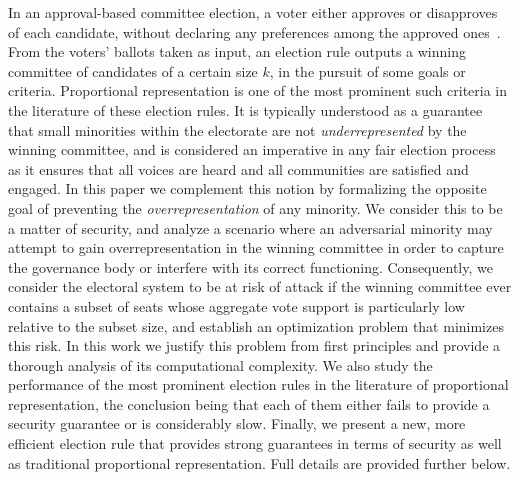 



In an approval-based committee election, a voter either approves or disapproves of each candidate, without declaring any preferences among the approved ones~\cite{lackner2020approval}. From the voters' ballots taken as input, an election rule outputs a winning committee of candidates of a certain size $k$, in the pursuit of some goals or criteria. Proportional representation is one of the most prominent such criteria in the literature of these election rules. 
It is typically understood as a guarantee that small minorities within the electorate are not \emph{underrepresented} by the winning committee, and is considered an imperative in any fair election process as it ensures that all voices are heard and all communities are satisfied and engaged. 
In this paper we complement this notion by formalizing the opposite goal of preventing the \emph{overrepresentation} of any minority. We consider this to be a matter of security, and analyze a scenario where an adversarial minority may attempt to gain overrepresentation in the winning committee in order to capture the governance body or interfere with its correct functioning. 
%
Consequently, we consider the electoral system to be at risk of attack if the winning committee ever contains a subset of seats whose aggregate vote support is particularly low relative to the subset size, and establish an optimization problem that minimizes this risk. 
In this work we justify this problem from first principles and provide a thorough analysis of its computational complexity. 
We also study the performance of the most prominent election rules in the literature of proportional representation, the conclusion being that each of them either fails to provide a security guarantee or is considerably slow. Finally, we present a new, more efficient election rule that provides strong guarantees in terms of security as well as traditional proportional representation. Full details are provided further below.

